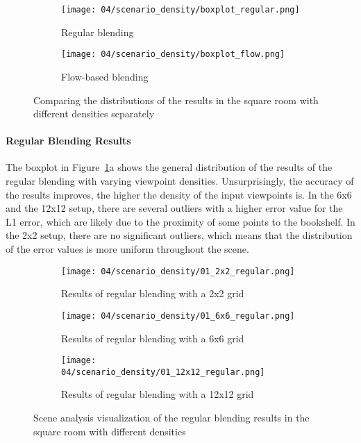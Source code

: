 \begin{figure}
\centering
    \hfill
    \begin{subfigure}[b]{0.5\textwidth}
            \centering
            \texttt{[image: 04/scenario\_density/boxplot\_regular.png]}
            \caption{Regular blending}
    \end{subfigure}%
    \hfill
    \begin{subfigure}[b]{0.5\textwidth}
            \centering
            \texttt{[image: 04/scenario\_density/boxplot\_flow.png]}
            \caption{Flow-based blending}
    \end{subfigure}
    \hfill
  \caption[Comparing the distributions of the results with different densities separately]{Comparing the distributions of the results in the square room with different densities separately}
  \label{fig:density_boxplot_split}
\end{figure}

\paragraph{Regular Blending Results}
The boxplot in Figure~\ref{fig:density_boxplot_split}a shows the general distribution of the results of the regular blending with varying viewpoint densities. Unsurprisingly, the accuracy of the results improves, the higher the density of the input viewpoints is.
In the 6x6 and the 12x12 setup, there are several outliers with a higher error value for the L1 error, which are likely due to the proximity of some points to the bookshelf. In the 2x2 setup, there are no significant outliers, which means that the distribution of the error values is more uniform throughout the scene.

\begin{figure}
\centering
    \hfill
    \begin{subfigure}[b]{0.32\textwidth}
            \centering
            \texttt{[image: 04/scenario\_density/01\_2x2\_regular.png]}
            \caption{Results of regular blending with a 2x2 grid}
    \end{subfigure}
    \hfill
    \begin{subfigure}[b]{0.32\textwidth}
            \centering
            \texttt{[image: 04/scenario\_density/01\_6x6\_regular.png]}
            \caption{Results of regular blending with a 6x6 grid}
    \end{subfigure}
    \hfill
    \begin{subfigure}[b]{0.32\textwidth}
            \centering
            \texttt{[image: 04/scenario\_density/01\_12x12\_regular.png]}
            \caption{Results of regular blending with a 12x12 grid}
    \end{subfigure}
    \hfill
  \caption{Scene analysis visualization of the regular blending results in the square room with different densities} \label{fig:density_regular_scene_analysis}
\end{figure}

